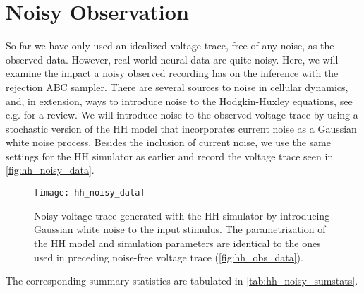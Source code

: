 


\section{Noisy Observation}

So far we have only used an idealized voltage trace, free of any noise, as the observed data. However, real-world neural data are quite noisy. Here, we will examine the impact a noisy observed recording has on the inference with the rejection ABC sampler. There are several sources to noise in cellular dynamics, and, in extension, ways to introduce noise to the Hodgkin-Huxley equations, see e.g. \cite{hh_noise} for a review. We will introduce noise to the observed voltage trace by using a stochastic version of the HH model that incorporates current noise as a Gaussian white noise process. Besides the inclusion of current noise, we use the same settings for the HH simulator as earlier and record the voltage trace seen in \autoref{fig:hh_noisy_data}.
\begin{figure}[!htb]
    \centering
    \texttt{[image: hh\_noisy\_data]}
    \caption{Noisy voltage trace generated with the HH simulator by introducing Gaussian white noise to the input stimulus. The parametrization of the HH model and simulation parameters are identical to the ones used in preceding noise-free voltage trace (\autoref{fig:hh_obs_data}).}
    \label{fig:hh_noisy_data}
\end{figure} 
The corresponding summary statistics are tabulated in \autoref{tab:hh_noisy_sumstats}. 
